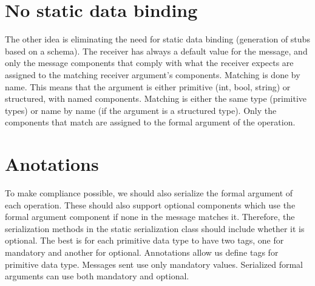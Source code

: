 \section{No static data binding}
\label{section:noDataBinding}

The other idea is eliminating the need for static data binding (generation of stubs based on a schema). The receiver has
always a default value for the message, and only the message components that comply with what the receiver expects are
assigned to the matching receiver argument's components. Matching is done by name. This means that the argument is either
primitive (int, bool, string) or structured, with named components. Matching is either the same type (primitive types) or
name by name (if the argument is a structured type). Only the components that match are assigned to the formal argument of
the operation.


\section{Anotations}
\label{section:anotations}
To make compliance possible, we should also serialize the formal argument of each operation. These should also support
optional components which use the formal argument component if none in the message matches it. Therefore,
the serialization methods in the static serialization class should include  whether it is optional.
The best is for each primitive data type to have two tags, one for mandatory and another for optional. Annotations allow us
define tags for primitive data type.
Messages sent use only mandatory values. Serialized formal arguments can use both mandatory and optional.


